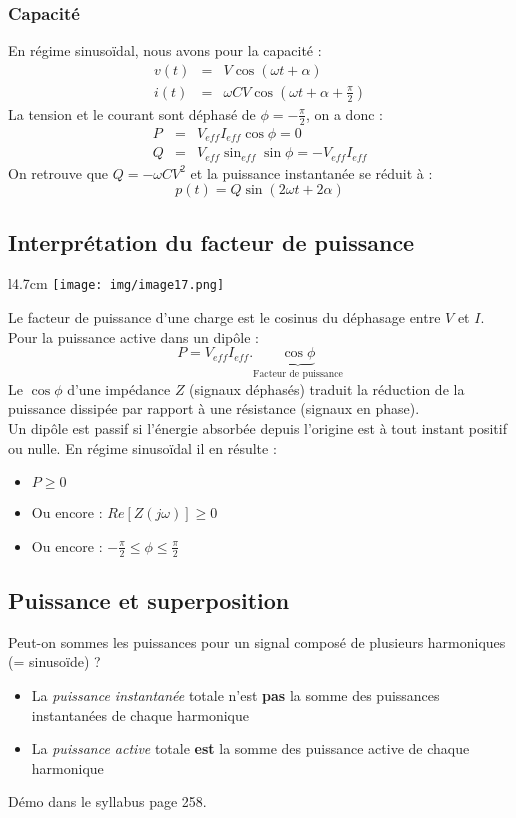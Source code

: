 \documentclass	[11pt, a4paper, openany]{book}
\begin{document}
\subsubsection{Capacité}
En régime sinusoïdal, nous avons pour la capacité :
\begin{eqnarray}
v(t) &=& V\cos(\omega t + \alpha)\\
i(t) &=& \omega CV\cos(\omega t + \alpha + \frac{\pi}{2})
\end{eqnarray}
La tension et le courant sont déphasé de $\phi = -\frac{\pi}{2}$, on a donc :
\begin{eqnarray}
P &=& V_{eff}I_{eff}\cos\phi = 0\\
Q &=& V_{eff}\sin_{eff}\sin\phi = -V_{eff}I_{eff}
\end{eqnarray}
On retrouve que $Q = -\omega CV^2$ et la puissance instantanée se réduit à : 
\begin{equation}
p(t) = Q\sin(2\omega t + 2 \alpha)
\end{equation}

\subsection{Interprétation du facteur de puissance}
\begin{wrapfigure}[12]{l}{4.7cm}
\texttt{[image: img/image17.png]}
\end{wrapfigure}
Le facteur de puissance d'une charge est le cosinus du déphasage entre $V$ et $I$. Pour la puissance active dans un dipôle :
\begin{equation}
P = V_{eff}I_{eff}.\underbrace{\cos\phi}_{\text{Facteur de puissance}}
\end{equation}
Le $\cos\phi$ d'une impédance $Z$ (signaux déphasés) traduit la réduction de la puissance dissipée par rapport à une résistance (signaux en phase).\\

Un dipôle est passif si l'énergie absorbée depuis l'origine est à tout instant positif ou  nulle. En régime sinusoïdal il en résulte :
\begin{itemize}
\item $P \geq 0$
\item Ou encore : $Re[Z(j\omega)] \geq 0$
\item Ou encore : $-\frac{\pi}{2} \leq \phi \leq \frac{\pi}{2}$
\end{itemize}

\setcounter{subsection}{6}
\subsection{Puissance et superposition}
Peut-on sommes les puissances pour un signal composé de plusieurs harmoniques (= sinusoïde) ? 
\begin{itemize}
\item La \textit{puissance instantanée} totale n'est \textbf{pas} la somme des puissances instantanées de chaque harmonique
\item La \textit{puissance active} totale \textbf{est} la somme des puissance active de chaque harmonique
\end{itemize}
Démo dans le syllabus page 258.
\end{document}
